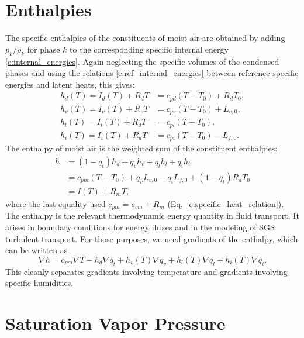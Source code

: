 \documentclass{report}
\begin{document}
\section{Enthalpies}\label{s:enthalpies}

The specific enthalpies of the constituents of moist air are obtained by adding $p_k/\rho_k$ for phase $k$ to the corresponding specific internal energy \eqref{e:internal_energies}. Again neglecting the specific volumes of the condensed phases and using the relations \eqref{e:ref_internal_energies} between reference specific energies and latent heats, this gives:
\begin{subequations}
\begin{align}
    h_d(T) = I_d(T) + R_d T &= c_{pd}(T-T_0) + R_d T_0, \\
    h_v(T) = I_v(T) + R_v T &= c_{pv}(T-T_0) + L_{v,0}, \\
    h_l(T) = I_l(T) + R_d T &= c_{pl}(T-T_0), \\
    h_i(T) = I_i(T) + R_d T &= c_{pi}(T-T_0) - L_{f,0}.
\end{align}
\end{subequations}
The enthalpy of moist air is the weighted sum of the constituent enthalpies:
\begin{equation}
\begin{split}
    h   &= (1-q_t) h_d + q_v h_v + q_l h_l + q_i h_i \\
        &= c_{pm} (T-T_0) + q_v L_{v,0} - q_i L_{f,0} + (1-q_t) R_d T_0\\
        &= I(T) + R_m T,
\end{split}
\end{equation}
where the last equality used $c_{pm} = c_{vm} + R_m$ (Eq.~\ref{e:specific_heat_relation}). The enthalpy is the relevant thermodynamic energy quantity in fluid transport. It arises in boundary conditions for energy fluxes and in the modeling of SGS turbulent transport. For those purposes, we need gradients of the enthalpy, which can be written as 
\begin{equation}\label{e:enthalpy_gradient}
    \nabla h = c_{pm} \nabla T - h_d \nabla q_t
    + h_v(T) \nabla q_v + h_l(T) \nabla q_l + h_i(T) \nabla q_i.
\end{equation}
This cleanly separates gradients involving temperature and gradients involving specific humidities.

\section{Saturation Vapor Pressure}
\end{document}
